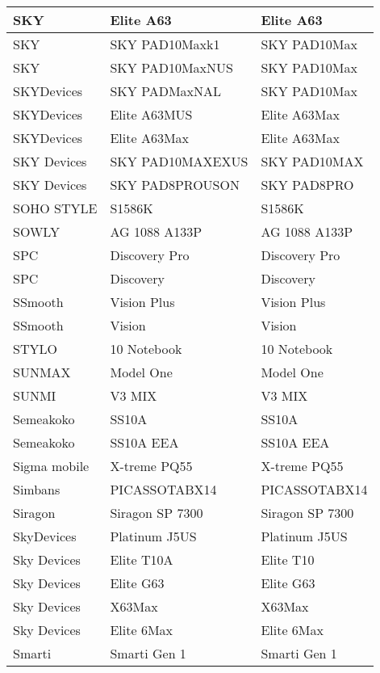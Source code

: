 \begin{tabularx}{\linewidth}{|l|X|X|}
        SKY & Elite A63 & Elite A63 \\ \hline
        SKY & SKY PAD10Maxk1 & SKY PAD10Max \\ \hline
        SKY & SKY PAD10MaxNUS & SKY PAD10Max \\ \hline
        SKYDevices & SKY PADMaxNAL & SKY PAD10Max \\ \hline
        SKYDevices & Elite A63MUS & Elite A63Max \\ \hline
        SKYDevices & Elite A63Max & Elite A63Max \\ \hline
        SKY Devices & SKY PAD10MAXEXUS & SKY PAD10MAX \\ \hline
        SKY Devices & SKY PAD8PROUSON & SKY PAD8PRO \\ \hline
        SOHO STYLE & S1586K & S1586K \\ \hline
        SOWLY & AG 1088 A133P & AG 1088 A133P \\ \hline
        SPC & Discovery Pro & Discovery Pro \\ \hline
        SPC & Discovery & Discovery \\ \hline
        SSmooth & Vision Plus & Vision Plus \\ \hline
        SSmooth & Vision & Vision \\ \hline
        STYLO & 10 Notebook & 10 Notebook \\ \hline
        SUNMAX & Model One & Model One \\ \hline
        SUNMI & V3 MIX & V3 MIX \\ \hline
        Semeakoko & SS10A & SS10A \\ \hline
        Semeakoko & SS10A EEA & SS10A EEA \\ \hline
        Sigma mobile & X-treme PQ55 & X-treme PQ55 \\ \hline
        Simbans & PICASSOTABX14 & PICASSOTABX14 \\ \hline
        Siragon & Siragon SP 7300 & Siragon SP 7300 \\ \hline
        SkyDevices & Platinum J5US & Platinum J5US \\ \hline
        Sky Devices & Elite T10A & Elite T10 \\ \hline
        Sky Devices & Elite G63 & Elite G63 \\ \hline
        Sky Devices & X63Max & X63Max \\ \hline
        Sky Devices & Elite 6Max & Elite 6Max \\ \hline
        Smarti & Smarti Gen 1 & Smarti Gen 1 \\ \hline

\end{tabularx}
